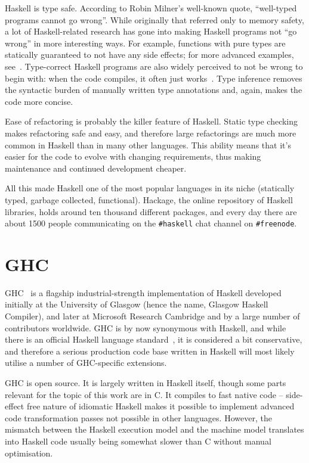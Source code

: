 \documentclass[a4paper,11pt,oneside]{report}
\begin{document}
Haskell is type safe. According to Robin Milner's well-known quote, ``well-typed
programs cannot go wrong''. While originally that referred only to memory
safety, a lot of Haskell-related research has gone into making Haskell programs
not ``go wrong'' in more interesting ways. For example, functions with pure
types are statically guaranteed to not have any side effects; for more advanced
examples, see~\cite{bib:gibbons2003}. Type-correct Haskell programs are also
widely perceived to not be wrong to begin with: when the code compiles, it often
just works~\cite{bib:wiki-works}. Type inference removes the syntactic burden of
manually written type annotations and, again, makes the code more concise.

Ease of refactoring is probably the killer feature of Haskell. Static type
checking makes refactoring safe and easy, and therefore large refactorings are
much more common in Haskell than in many other languages. This ability means
that it's easier for the code to evolve with changing requirements, thus making
maintenance and continued development cheaper.

All this made Haskell one of the most popular languages in its niche (statically
typed, garbage collected, functional). Hackage, the online repository of Haskell
libraries, holds around ten thousand different packages, and every day there are
about 1500 people communicating on the \texttt{\#haskell} chat channel on
\texttt{\#freenode}.

\section{GHC}

GHC~\cite{bib:ghc} is a flagship industrial-strength implementation of Haskell
developed initially at the University of Glasgow (hence the name, Glasgow
Haskell Compiler), and later at Microsoft Research Cambridge and by a large
number of contributors worldwide. GHC is by now synonymous with Haskell, and
while there is an official Haskell language standard~\cite{bib:haskell2010}, it
is considered a bit conservative, and therefore a serious production code base
written in Haskell will most likely utilise a number of GHC-specific extensions.

GHC is open source. It is largely written in Haskell itself, though some parts
relevant for the topic of this work are in C. It compiles to fast native code --
side-effect free nature of idiomatic Haskell makes it possible to implement
advanced code transformation passes not possible in other languages. However,
the mismatch between the Haskell execution model and the machine model
translates into Haskell code usually being somewhat slower than C without manual
optimisation.
\end{document}
